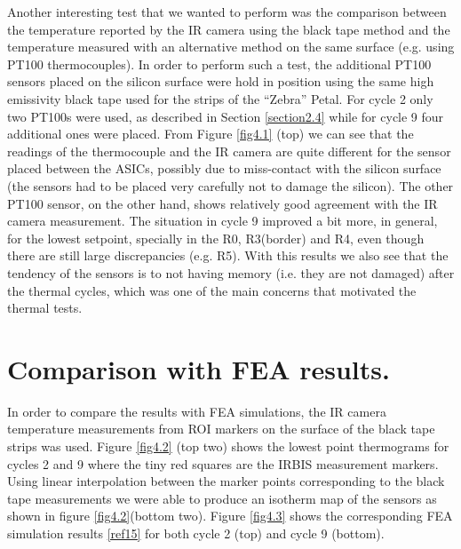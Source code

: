 		Another interesting test that we wanted to perform was the comparison between the temperature reported by the IR camera using the black tape method and the temperature measured with an alternative method on the same surface (e.g. using PT100 thermocouples). In order to perform such a test, the additional PT100 sensors placed on the silicon surface were hold in position using the same high emissivity black tape used for the strips of the “Zebra” Petal. For cycle 2 only two PT100s were used, as described in Section \ref{section2.4} while for cycle 9 four additional ones were placed. From Figure \ref{fig4.1} (top) we can see that the readings of the thermocouple and the IR camera are quite different for the sensor placed between the ASICs, possibly due to miss-contact with the silicon surface (the sensors had to be placed very carefully not to damage the silicon). The other PT100 sensor, on the other hand, shows relatively good agreement with the IR camera measurement. The situation in cycle 9 improved a bit more, in general, for the lowest setpoint, specially in the R0, R3(border) and R4, even though there are still large discrepancies (e.g. R5). With this results we also see that the tendency of the sensors is to not having memory (i.e. they are not damaged) after the thermal cycles, which was one of the main concerns that motivated the thermal tests.\bigskip
		
	\section{Comparison with FEA results.}\label{section4.2}	
	
		In order to compare the results with FEA simulations, the IR camera temperature measurements from ROI markers on the surface of the black tape strips was used. Figure \ref{fig4.2} (top two) shows the lowest point thermograms for cycles 2 and 9 where the tiny red squares are the IRBIS measurement markers. Using linear interpolation between the marker points corresponding to the black tape measurements we were able to produce an isotherm map of the sensors as shown in figure \ref{fig4.2}(bottom two). Figure \ref{fig4.3} shows the corresponding FEA simulation results \ref{ref15} for both cycle 2 (top) and cycle 9 (bottom).
		
